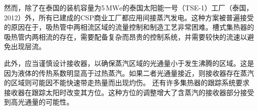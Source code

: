 然而，除了在泰国的装机容量为5$\,\mathrm{MWe}$的泰国太阳能一号（TSE-1）工厂（泰国，2012）外，所有已建成的CSP商业工厂都应用间接蒸汽发电\cite{Khenissi2015}。这种方案被普遍接受的原因在于，吸热管中两相流区域的流量控制和制造工艺非常困难。槽式集热器的吸热管内两相流的存在，需要配备复杂而昂贵的控制系统，并需要较快的流速以避免出现层流。

此外，应当谨慎设计接收器，以确保蒸汽区域的光通量小于发生沸腾的区域。这是因为液体的传热系数明显高于过热蒸汽。如果二者光通量接近，则接收器存在蒸汽的区域则可能因不能快速带走热量而出现灼伤。
还有许多集热器的跟踪系统要求接收器在跟踪太阳时改变其方位。这种方位的调整增大了含蒸汽的接收器部分接受到高光通量的可能性。
			
